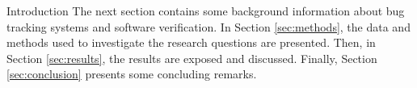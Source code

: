 \begin{section}{Introduction}
	The next section contains some background information about bug tracking systems and software verification. In Section \ref{sec:methods}, the data and methods used to investigate the research questions are presented. Then, in Section \ref{sec:results}, the results are exposed and discussed. Finally, Section \ref{sec:conclusion} presents some concluding remarks.
	




\end{section}

